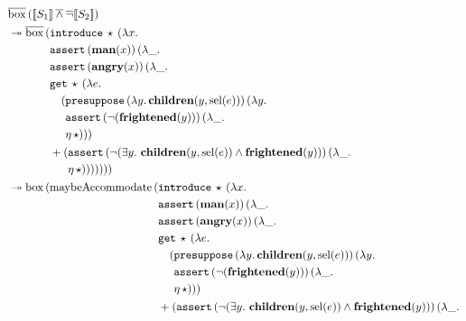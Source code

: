 \begin{align*}
  &\ap{\DBOX}{(\sem{S_1} \dand \dnot \sem{S_2})} \\
  &\tto \ap{\DBOX}{(\begin{aligned}[t]
      &\app{\op{introduce}}{\star}{(\lam{x}{ \\
      &\app{\op{assert}}{(\obj{man}(x))}{(\lam{\_}{ \\
      &\app{\op{assert}}{(\obj{angry}(x))}{(\lam{\_}{ \\
      &\app{\op{get}}{\star}{(\lam{e}{ \\
      &\quad \begin{aligned}[t]
          (&\app{\op{presuppose}}{(\lam{y}{\obj{children}(y, \sel(e))})}{(\lam{y}{ \\
           &\app{\op{assert}}{(\lnot (\obj{frightened}(y)))}{(\lam{\_}{ \\
           &\etaE{\star}})}})})
         \end{aligned} \\
      &+ \begin{aligned}[t]
          (&\app{\op{assert}}{(\lnot (\exists y.\ \obj{children}(y, \sel(e)) \land \obj{frightened}(y)))}{(\lam{\_}{ \\
           &\etaE{\star}})}))))))
         \end{aligned}}}}}}}}}
    \end{aligned}} \\
  &\tto \ap{\BOX}{(\ap{\maybeAccommodate}{(\begin{aligned}[t]
      &\app{\op{introduce}}{\star}{(\lam{x}{ \\
      &\app{\op{assert}}{(\obj{man}(x))}{(\lam{\_}{ \\
      &\app{\op{assert}}{(\obj{angry}(x))}{(\lam{\_}{ \\
      &\app{\op{get}}{\star}{(\lam{e}{ \\
      &\quad \begin{aligned}[t]
          (&\app{\op{presuppose}}{(\lam{y}{\obj{children}(y, \sel(e))})}{(\lam{y}{ \\
           &\app{\op{assert}}{(\lnot (\obj{frightened}(y)))}{(\lam{\_}{ \\
           &\etaE{\star}})}})})
         \end{aligned} \\
      &+ \begin{aligned}[t]
          (&\app{\op{assert}}{(\lnot (\exists y.\ \obj{children}(y, \sel(e)) \land \obj{frightened}(y)))}{(\lam{\_}{ \\
}}
\end{aligned}}}}}}}}}
\end{aligned}}}
\end{align*}
